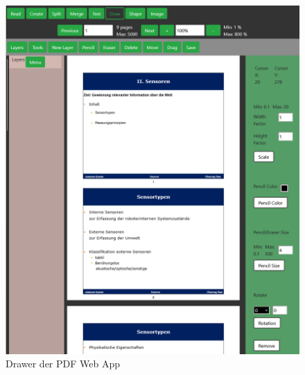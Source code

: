 \begin{figure}[!htbp]
	\centering
	\includegraphics[width=1\textwidth]{"images/drawer.png"}
	\caption{Drawer der PDF Web App}
	\label{fig:drawer}
\end{figure}


